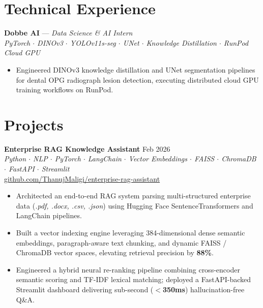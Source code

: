 \documentclass[a4paper,10pt]{article}
\begin{document}

\section*{Technical Experience}

\textbf{Dobbe AI} --- \textit{Data Science \& AI Intern}\\
\textit{PyTorch $\cdot$ DINOv3 $\cdot$ YOLOv11s-seg $\cdot$ UNet $\cdot$ Knowledge Distillation $\cdot$ RunPod Cloud GPU}
\begin{itemize}[leftmargin=*,noitemsep,topsep=1pt,parsep=0pt,partopsep=0pt,itemsep=1pt]
\item Engineered DINOv3 knowledge distillation and UNet segmentation pipelines for dental OPG radiograph lesion detection, executing distributed cloud GPU training workflows on RunPod.
\end{itemize}


\section*{Projects}

\textbf{Enterprise RAG Knowledge Assistant} \hfill Feb 2026\\
\textit{Python $\cdot$ NLP $\cdot$ PyTorch $\cdot$ LangChain $\cdot$ Vector Embeddings $\cdot$ FAISS $\cdot$ ChromaDB $\cdot$ FastAPI $\cdot$ Streamlit}\\
\href{https://github.com/ThanujMaligi/enterprise-rag-assistant}{github.com/ThanujMaligi/enterprise-rag-assistant}
\begin{itemize}[leftmargin=*,noitemsep,topsep=1pt,parsep=0pt,partopsep=0pt,itemsep=1pt]
\item Architected an end-to-end RAG system parsing multi-structured enterprise data (\textit{.pdf, .docx, .csv, .json}) using Hugging Face SentenceTransformers and LangChain pipelines.
\item Built a vector indexing engine leveraging 384-dimensional dense semantic embeddings, paragraph-aware text chunking, and dynamic FAISS / ChromaDB vector spaces, elevating retrieval precision by \textbf{88\%}.
\item Engineered a hybrid neural re-ranking pipeline combining cross-encoder semantic scoring and TF-IDF lexical matching; deployed a FastAPI-backed Streamlit dashboard delivering sub-second (\textbf{$<$350ms}) hallucination-free Q\&A.
\end{itemize}
\end{document}
